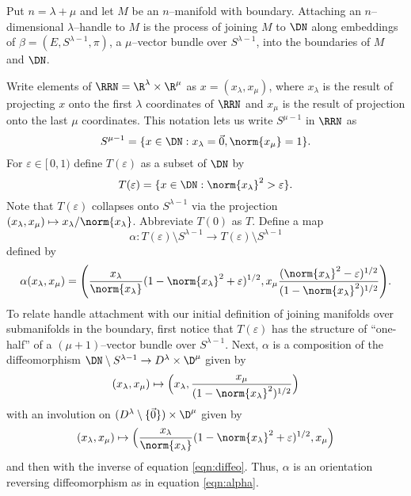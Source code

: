 Put $n=\lambda+\mu$ and let $M$ be an $n$--manifold with boundary.
Attaching an $n$--dimensional $\lambda$--handle to $M$ is the process of joining $M$ to $\DN$ along embeddings of $\beta=(E,S^{\lambda-1},\pi)$, a $\mu$--vector bundle over $S^{\lambda-1}$, into the boundaries of $M$ and $\DN$.

Write elements of $\RRN=\R^\lambda\times\R^\mu$ as $x=(x_\lambda,x_\mu)$, where $x_\lambda$ is the result of projecting $x$ onto the first $\lambda$ coordinates of $\RRN$ and $x_\mu$ is the result of projection onto the last $\mu$ coordinates.
This notation lets us write $S^{\mu-1}$ in $\RRN$ as
\[
	S^{\mu-1} = \{x\in \DN: x_\lambda=\vec{0},\norm{x_\mu}=1\}.
\]
For $\varepsilon\in [\,0,1)$ define $T(\varepsilon)$ as a subset of $\DN$ by
\[
	T(\varepsilon) = \{x\in \DN: \norm{x_\lambda}^2>\varepsilon\}.
\]
Note that $T(\varepsilon)$ collapses onto $S^{\lambda-1}$ via the projection $(x_\lambda,x_\mu)\mapsto x_\lambda/\norm{x_\lambda}$.
Abbreviate $T(0)$ as $T$.
Define a map
\[
	\alpha:T(\varepsilon)\setminus S^{\lambda-1} \to T(\varepsilon)\setminus S^{\lambda-1}
\]
defined by
\begin{equation}
	\alpha(x_\lambda, x_\mu) =
	\Bigg( 
		\frac{x_\lambda}{\norm{x_\lambda}}
		(1-\norm{x_\lambda}^2+\varepsilon)^{1/2},
		x_\mu
		\frac{
			(\norm{x_\lambda}^2-\varepsilon)^{1/2}
		}{
			(1-\norm{x_\lambda}^2)^{1/2}
		}
	\Bigg).
\end{equation}
To relate handle attachment with our initial definition of joining manifolds over submanifolds in the boundary, first notice that $T(\varepsilon)$ has the structure of ``one-half'' of a $(\mu+1)$--vector bundle over $S^{\lambda-1}$.
Next, $\alpha$ is a composition of the diffeomorphism $\DN\setminus S^{\lambda-1}\to D^\lambda\times \D^\mu$ given by
\begin{equation}
	\label{eqn:diffeo}
	(x_\lambda,x_\mu)\mapsto \Big(x_\lambda,\frac{x_\mu}{(1-\norm{x_\lambda}^2)^{1/2}}\Big)
\end{equation}
with an involution on $(D^\lambda\setminus\{\vec{0}\})\times \D^\mu$ given by
\begin{equation}
	(x_\lambda,x_\mu)\mapsto \Big(\frac{x_\lambda}{\norm{x_\lambda}}(1-\norm{x_\lambda}^2+\varepsilon)^{1/2},x_\mu \Big)
\end{equation}
and then with the inverse of equation \ref{eqn:diffeo}.
Thus, $\alpha$ is an orientation reversing diffeomorphism as in equation \ref{eqn:alpha}.